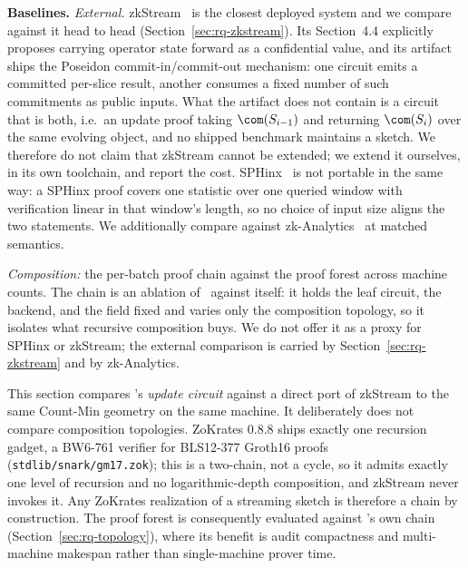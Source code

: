 \textbf{Baselines.}  \emph{External.}  zkStream~\cite{zkStreamMiddleware2024} is
the closest deployed system and we compare against it head to head
(Section~\ref{sec:rq-zkstream}).  Its Section~4.4 explicitly proposes carrying
operator state forward as a confidential value, and its artifact ships the
Poseidon commit-in/commit-out mechanism: one circuit emits a committed
per-slice result, another consumes a fixed number of such commitments as public
inputs.  What the artifact does not contain is a circuit that is both, i.e.\ an
update proof taking $\com(S_{i-1})$ and returning $\com(S_i)$ over the same
evolving object, and no shipped benchmark maintains a sketch.  We therefore do
not claim that zkStream cannot be extended; we extend it ourselves, in its own
toolchain, and report the cost.  SPHinx~\cite{FioreTuckerSignedStreams2022} is
not portable in the same way: a SPHinx proof covers one statistic over one
queried window with verification linear in that window's length, so no choice of
input size aligns the two statements.  We additionally compare against
zk-Analytics~\cite{XXX} at matched semantics.

\emph{Composition:} the per-batch proof chain against the proof forest across
machine counts.  The chain is an ablation of \sys\ against itself: it holds the
leaf circuit, the backend, and the field fixed and varies only the composition
topology, so it isolates what recursive composition buys.  We do not offer it as
a proxy for SPHinx or zkStream; the external comparison is carried by
Section~\ref{sec:rq-zkstream} and by zk-Analytics.

This section compares \sys's \emph{update circuit} against a direct port of
zkStream to the same Count-Min geometry on the same machine.  It deliberately
does not compare composition topologies.  ZoKrates 0.8.8 ships exactly one
recursion gadget, a BW6-761 verifier for BLS12-377 Groth16 proofs
(\texttt{stdlib/snark/gm17.zok}); this is a two-chain, not a cycle, so it admits
exactly one level of recursion and no logarithmic-depth composition, and
zkStream never invokes it.  Any ZoKrates realization of a streaming sketch is
therefore a chain by construction.  The proof forest is consequently evaluated
against \sys's own chain (Section~\ref{sec:rq-topology}), where its benefit is
audit compactness and multi-machine makespan rather than single-machine prover
time.
